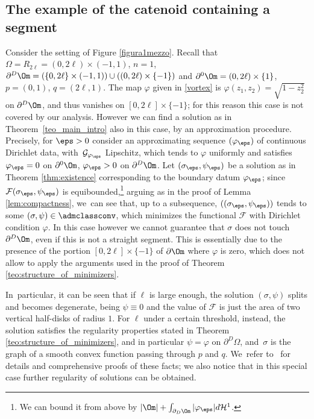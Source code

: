 \subsection{The example of the catenoid containing a segment}
\label{subsec:the_example_of_the_catenoid_containing_a_segment}
Consider the setting of
Figure \ref{figura1mezzo}. Recall that
$\Omega=R_{2\ell}=(0,2\ell)\times (-1,1)$,
$n=1$, $\partial^D\Om=(\{0,2\ell\}\times (-1,1))\cup ((0,2\ell)\times \{-1\})$ and $\partial^0\Om=(0,2\ell)\times \{1\}$, $p=(0,1)$, $q=(2\ell,1)$.
The map $\varphi$ given in \eqref{vortex} is $\varphi(z_1,z_2)=\sqrt{1-z_2^2}$ on $\partial^D
\Om$, and thus
vanishes on $[0,2\ell]\times \{-1\}$; for this reason this case is not covered by our analysis. However we can find a solution as in Theorem~\ref{teo_main_intro} also in this case, by an approximation procedure.
Precisely, for $\eps>0$ consider an approximating sequence $(\varphi_\eps)$ of continuous Dirichlet data, with~$\mathcal G_{\varphi_\eps}$ Lipschitz, which tends to $\varphi$ uniformly and satisfies $\varphi_\eps=0$ on $\partial^0\Om$, $\varphi_\eps>0$ on $\partial^D\Om$. Let $(\sigma_\eps,\psi_\eps)$ be a solution as in Theorem \ref{thm:existence} corresponding to the boundary datum $\varphi_\eps$; since $\mathcal F(\sigma_\eps,\psi_\eps)$ is equibounded,\footnote{We can bound it from above by $|\Om|+\int_{\partial_D\Om}|\varphi_\eps|d\mathcal H^1$.} arguing as in the proof of Lemma \ref{lem:compactness}, we~can see that, up to
a subsequence, $((\sigma_\eps,\psi_\eps))$ tends to some $(\sigma,\psi)\in \admclassconv$, which minimizes the functional $\mathcal F$ with Dirichlet condition $\varphi$.
In this case however we cannot guarantee that $\sigma$ does not touch $\partial^D\Om$, even if this is not a straight segment.
This is essentially due to the presence of the
portion $[0,2\ell]\times \{-1\}$ of $\partial \Om$
where $\varphi$ is zero, which does not allow to apply the arguments used in the proof of Theorem \ref{teo:structure_of_minimizers}.\enlargethispage{2pt}

In~particular, it can be seen that if $\ell$ is large enough,
the solution $(\sigma,\psi)$ splits and becomes degenerate,
being $\psi\equiv0$ and the value of $\mathcal F$ is
just the area of two vertical half-disks of radius $1$. For $\ell$ under a certain threshold, instead, the solution satisfies the regularity properties stated in Theorem \ref{teo:structure_of_minimizers}, and in particular $\psi=\varphi$ on $\partial^D\Omega$, and~$\sigma$ is the graph of a smooth convex function passing through $p$ and $q$. We~refer to~\cite{BES2} for details and comprehensive proofs of these facts;
we also notice that in this special case further regularity of solutions
can be obtained.

